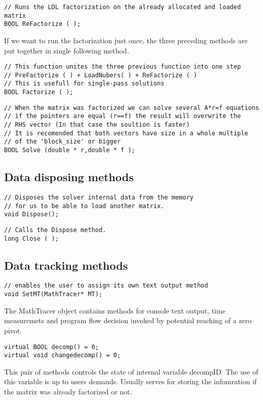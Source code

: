 \documentclass[12pt]{article}
\begin{document}
\begin{verbatim}
// Runs the LDL factorization on the already allocated and loaded matrix
BOOL ReFactorize ( );
\end{verbatim}

If we want to run the factorization just once, the three preceding methods are put together in single following method.

\begin{verbatim}
// This function unites the three previous function into one step
// PreFactorize ( ) + LoadNubers( ) + ReFactorize ( )
// This is usefull for single-pass solutions
BOOL Factorize ( );
\end{verbatim}

\begin{verbatim}
// When the matrix was factorized we can solve several A*r=f equations
// if the pointers are equal (r==f) the result will overwrite the 
// RHS vector (In that case the soultion is faster)
// It is recomended that both vectors have size in a whole multiple 
// of the 'block_size' or bigger
BOOL Solve (double * r,double * f );
\end{verbatim}

\subsection{Data disposing methods}
\begin{verbatim}
// Disposes the solver internal data from the memory 
// for us to be able to load another matrix.
void Dispose();
\end{verbatim}

\begin{verbatim}
// Calls the Dispose method.
long Close ( );
\end{verbatim}

\subsection{Data tracking methods}
\begin{verbatim}
// enables the user to assign its own text output method
void SetMT(MathTracer* MT);
\end{verbatim}
The MathTracer object contains methods for console text output, time measuremets and program flow decision invoked by potential reaching of a zero pivot.

\begin{verbatim}
virtual BOOL decomp() = 0;
virtual void changedecomp() = 0;
\end{verbatim}
This pair of methods controls the state of internal variable decompID. The use of this variable is up to users demands. Usually serves for storing the infomration if the matrix was already factorized or not.
\end{document}
